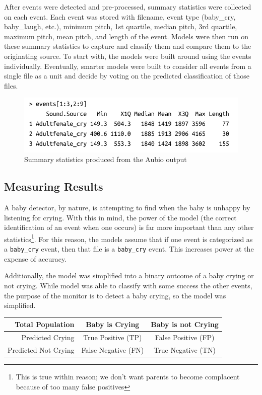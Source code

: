 \documentclass[paper=a4, fontsize=11pt]{scrartcl}
\numberwithin{equation}{section}
\numberwithin{figure}{section}
\numberwithin{table}{section}
\begin{document}
After events were detected and pre-processed, summary statistics were collected on each event. Each event was stored with filename, event type (baby\_cry, baby\_laugh, etc.), minimum pitch, 1st quartile, median pitch, 3rd quartile, maximum pitch, mean pitch, and length of the event. Models were then run on these summary statistics to capture and classify them and compare them to the originating source. To start with, the models were built around using the events individually. Eventually, smarter models were built to consider all events from a single file as a unit and decide by voting on the predicted classification of those files.

\begin{figure}[H]
\begin{center}
\includegraphics[width=.65\textwidth]{aubio_events.pdf}
\caption{Summary statistics produced from the Aubio output}
\end{center}
\end{figure}

\subsection{Measuring Results}

A baby detector, by nature, is attempting to find when the baby is unhappy by listening for crying. With this in mind, the power of the model (the correct identification of an event when one occurs) is far more important than any other statistics\footnote{This is true within reason; we don't want parents to become complacent because of too many false positives}. For this reason, the models assume that if one event is categorized as a \texttt{baby\_cry} event, then that file is a \texttt{baby\_cry} event. This increases power at the expense of accuracy.

Additionally, the model was simplified into a binary outcome of a baby crying or not crying. While model was able to classify with some success the other events, the purpose of the monitor is to detect a baby crying, so the model was simplified.

\begin{center}
\begin{tabular}{ r | c | c |}
Total Population & Baby is Crying & Baby is not Crying \\\hline
Predicted Crying & \cellcolor{green!25}True Positive (TP) & \cellcolor{red!25}False Positive (FP) \\\hline
Predicted Not Crying & \cellcolor{red!25}False Negative (FN) & \cellcolor{green!25}True Negative (TN)\\\hline
\end{tabular}
\end{center}
\end{document}
